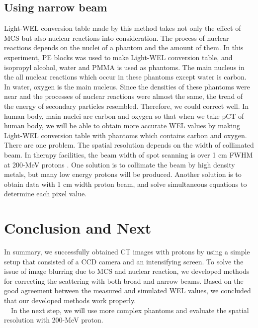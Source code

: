 \documentclass[preprint,3pt]{elsarticle} %
\begin{document}
{\subsection{Using narrow beam}
	Light-WEL conversion table made by this method takes not only the effect of MCS but also nuclear reactions into consideration. The process of nuclear reactions depends on the nuclei of a phantom and the amount of them. In this experiment, PE blocks was used to make Light-WEL conversion table, and isopropyl alcohol, water and PMMA is used as phantoms.  The main nucleus in the all nuclear reactions which occur in these phantoms except water is carbon. In water, oxygen is the main nucleus. Since the densities of these phantoms were near and the processes of nuclear reactions were almost the same, the trend of the energy of secondary particles resembled. Therefore, we could correct well. In human body, main nuclei are carbon and oxygen so that when we take pCT of human body, we will be able to obtain more accurate WEL values by making Light-WEL conversion table with phantoms which contains carbon and oxygen.\\
	There are one problem. The spatial resolution depends on the width of collimated beam. In therapy facilities, the beam width of spot scanning is over 1 cm FWHM at 200-MeV protons {\cite{nagoya}}. One solution is to collimate the beam by high density metals, but many low energy protons will be produced. Another solution is to obtain data with 1 cm width proton beam, and solve simultaneous equations to determine each pixel value.\\
	
\section{Conclusion and Next}
In summary, we successfully obtained CT images with protons by using a simple setup that consisted of a CCD camera and an intensifying screen. To solve the issue of image blurring due to MCS and nuclear reaction, we developed methods for correcting the scattering with both broad and narrow beams. Based on the good agreement between the measured and simulated WEL values, we concluded that our developed methods work properly.\\
　In the next step, we will use more complex phantoms and evaluate the spatial resolution with 200-MeV proton. 

\label{}


}
\end{document}
